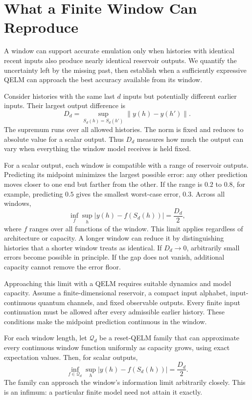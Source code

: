 \section{What a Finite Window Can Reproduce}
\label{sec:criterion}

A window can support accurate emulation only when histories with identical
recent inputs also produce nearly identical reservoir outputs. We quantify
the uncertainty left by the missing past, then establish when a sufficiently
expressive QELM can approach the best accuracy available from its window.

Consider histories with the same last $d$ inputs but potentially different
earlier inputs. Their largest output difference is
\begin{equation}
 D_d=\sup_{S_d(h)=S_d(h')}\|y(h)-y(h')\|.
 \label{eq:diameter}
\end{equation}
The supremum runs over all allowed histories. The norm is fixed and reduces
to absolute value for a scalar output. Thus $D_d$ measures how much the
output can vary when everything the window model receives is held fixed.

For a scalar output, each window is compatible with a range of reservoir
outputs. Predicting its midpoint minimizes the largest possible error:
any other prediction moves closer to one end but farther from the other.
If the range is $0.2$ to $0.8$, for example, predicting $0.5$ gives the
smallest worst-case error, $0.3$. Across all windows,
\begin{equation}
 \inf_f\sup_h |y(h)-f(S_d(h))|=\frac{D_d}{2},
 \label{eq:window-law}
\end{equation}
where $f$ ranges over all functions of the window. This limit applies
regardless of architecture or capacity. A longer window can reduce it by
distinguishing histories that a shorter window treats as identical. If
$D_d\to0$, arbitrarily small errors become possible in principle. If the
gap does not vanish, additional capacity cannot remove the error floor.

Approaching this limit with a QELM requires suitable dynamics and model
capacity. Assume a finite-dimensional reservoir, a compact input alphabet,
input-continuous quantum channels, and fixed observable outputs. Every
finite input continuation must be allowed after every admissible earlier
history. These conditions make the midpoint prediction continuous in
the window.

For each window length, let $\mathcal Q_d$ be a reset-QELM family that can
approximate every continuous window function uniformly as capacity grows,
using exact expectation values. Then, for scalar outputs,
\begin{equation}
 \inf_{f\in\mathcal Q_d}\sup_h
 |y(h)-f(S_d(h))|=\frac{D_d}{2}.
 \label{eq:qrc-qelm-equivalence}
\end{equation}
The family can approach the window's information limit arbitrarily closely.
This is an infimum: a particular finite model need not attain it exactly.

